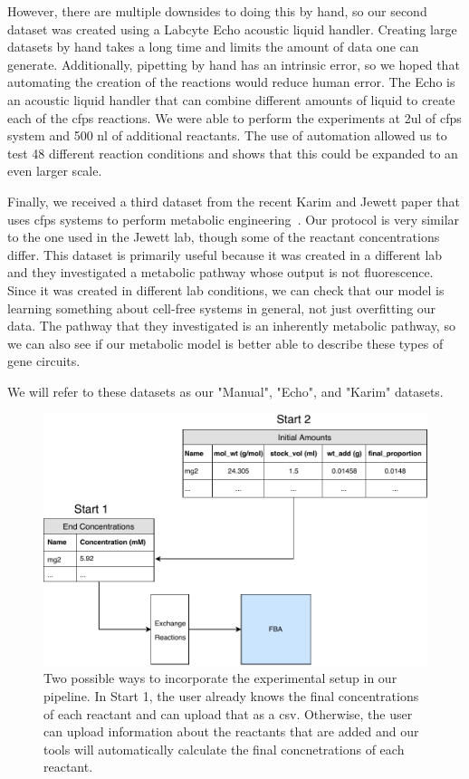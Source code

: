 However, there are multiple downsides to doing this by hand, so our second dataset was created using a Labcyte Echo acoustic liquid handler.
Creating large datasets by hand takes a long time and limits the amount of data one can generate.
Additionally, pipetting by hand has an intrinsic error, so we hoped that automating the creation of the reactions would reduce human error.
The Echo is an acoustic liquid handler that can combine different amounts of liquid to create each of the \gls{cfps} reactions.
We were able to perform the experiments at 2\gls{ul} of \gls{cfps} system and 500 \gls{nl} of additional reactants.
The use of automation allowed us to test 48 different reaction conditions and shows that this could be expanded to an even larger scale.

Finally, we received a third dataset from the recent Karim and Jewett paper that uses \gls{cfps} systems to perform metabolic engineering~\cite{karim2018controlling}.
Our protocol is very similar to the one used in the Jewett lab, though some of the reactant concentrations differ.
This dataset is primarily useful because it was created in a different lab and they investigated a metabolic pathway whose output is not fluorescence.
Since it was created in different lab conditions, we can check that our model is learning something about cell-free systems in general, not just overfitting our data.
The pathway that they investigated is an inherently metabolic pathway, so we can also see if our metabolic model is better able to describe these types of gene circuits.

We will refer to these datasets as our "Manual", "Echo", and "Karim" datasets.

\begin{figure}[t!]
\begin{center}
\includegraphics[width=\textwidth]{figs/DataIngestion.pdf}
\caption[Data ingestion part of our pipeline]{Two possible ways to incorporate the experimental setup in our pipeline.
In Start 1, the user already knows the final concentrations of each reactant and can upload that as a \gls{csv}.
Otherwise, the user can upload information about the reactants that are added and our tools will automatically calculate the final concnetrations of each reactant.}
\label{fig:ingest}
\end{center}
\end{figure}

